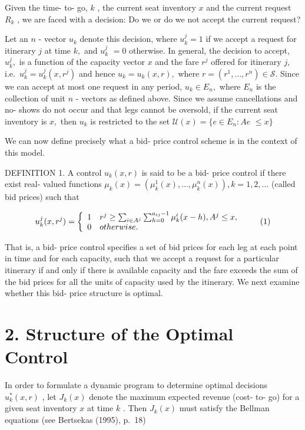 Given the time- to- go, \(k\) , the current seat inventory \(x\) and the
current request \(R_{k}\) , we are faced with a decision: Do we or do we
not accept the current request?

Let an \(n\) - vector \(u_{k}\) denote this decision, where
\(u_{k}^{j} = 1\) if we accept a request for itinerary \(j\) at time
\(k,\) and \(u_{k}^{j}\) \(= 0\) otherwise. In general, the decision to
accept, \(u_{k}^{j},\) is a function of the capacity vector \(x\) and
the fare \(r^{j}\) offered for itinerary \(j,\)
i.e.~\(u_{k}^{j} = u_{k}^{j}(x,r^{j})\) and hence
\(u_{k} = u_{k}(x,r),\) where
\(r = (r^{1},\ldots ,r^{n})\in \mathcal{S}.\) Since we can accept at
most one request in any period, \(u_{k}\in E_{n},\) where \(E_{n}\) is
the collection of unit \(n\) - vectors as defined above. Since we assume
cancellations and no- shows do not occur and that legs cannot be
oversold, if the current seat inventory is \(x,\) then \(u_{k}\) is
restricted to the set \(\mathcal{U}(x) = \{e\in E_{n}:A e\) \(\leq x\}\)

We can now define precisely what a bid- price control scheme is in the
context of this model.

DEFINITION 1. A control \(u_{k}(x,r)\) is said to be a bid- price
control if there exist real- valued functions
\(\mu_{k}(x) = (\mu_{k}^{1}(x), \ldots , \mu_{k}^{n}(x)), k = 1,2, \dots\)
(called bid prices) such that

\[
u_{k}^{j}(x,r^{j}) = \left\{ \begin{array}{l l}{1} & {r^{j}\geq \sum_{i\in A^{j}}\sum_{h = 0}^{a_{i j} - 1}\mu_{k}^{i}(x - h),A^{j}\leq x,}\\ {0} & {o t h e r w i s e.} \end{array} \right. \tag{1}
\]

That is, a bid- price control specifies a set of bid prices for each leg
at each point in time and for each capacity, such that we accept a
request for a particular itinerary if and only if there is available
capacity and the fare exceeds the sum of the bid prices for all the
units of capacity used by the itinerary. We next examine whether this
bid- price structure is optimal.

\section{2. Structure of the Optimal
Control}\label{structure-of-the-optimal-control}

In order to formulate a dynamic program to determine optimal decisions
\(u_{k}^{*}(x,r)\) , let \(J_{k}(x)\) denote the maximum expected
revenue (cost- to- go) for a given seat inventory \(x\) at time \(k\) .
Then \(J_{k}(x)\) must satisfy the Bellman equations (see Bertsekas
(1995), p.~18)

